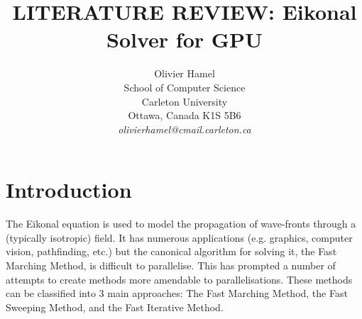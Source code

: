 \documentclass[11pt]{article}       %
\begin{document}


\title{LITERATURE REVIEW: Eikonal Solver for GPU}


\author{
Olivier Hamel\\
School of Computer Science\\
Carleton University\\
Ottawa, Canada K1S 5B6\\
{\em olivierhamel@cmail.carleton.ca}
} %

\maketitle



\section{Introduction} \label{intro}
\begin{comment}
Introduce your project topic (start from parallel computing in
general and lead to your particular topic). Describe what you
intend to achieve in your project.
\end{comment}


The Eikonal equation is used to model the propagation of wave-fronts through a (typically isotropic) field. It has numerous applications (e.g. graphics, computer vision, pathfinding, etc.) but the canonical algorithm for solving it, the Fast Marching Method, is difficult to parallelise. This has prompted a number of attempts to create methods more amendable to parallelisations. These methods can be classified into 3 main approaches: The Fast Marching Method, the Fast Sweeping Method\cite{qian2007fast}, and the Fast Iterative Method\cite{jeong2008fast}.
\end{document}
